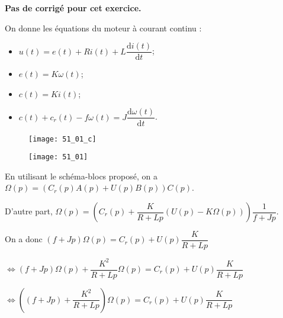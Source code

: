 \normaltrue \difficilefalse \tdifficilefalse
\correctiontrue


\setcounter{question}{0}
\ifcorrection
\else
\textbf{Pas de corrigé pour cet exercice.}
\fi


\ifprof 
\else
On donne les équations du moteur à courant continu :
\begin{itemize}
\item $u(t) = e(t)+ Ri(t) +L \dfrac{\text{d}i(t)}{\text{d} t}$;
\item $e(t)=K\omega(t)$;
\item $c(t)=Ki(t)$;
\item $c(t)+c_r(t)- f\omega(t)=J\dfrac{\text{d}\omega(t)}{\text{d} t}$.
\end{itemize}
\fi

\ifprof
\begin{figure}[H]
\centering
\texttt{[image: 51\_01\_c]}
\end{figure}
\else
\fi



\ifprof
\begin{figure}[H]
\centering
\texttt{[image: 51\_01]}
\end{figure}


En utilisant le schéma-blocs proposé, on a $\Omega(p) = \left(C_r(p)A(p)+U(p)B(p)\right)C(p)$.

D'autre part,  $\Omega(p)=\left( C_r(p) + \dfrac{K}{R+Lp}\left(U(p)-K\Omega(p) \right) \right) \dfrac{1}{f+Jp}$.

On a donc $\left(f+Jp \right)\Omega(p)= C_r(p) + U(p)\dfrac{K}{R+Lp}  $

$\Leftrightarrow \left(f+Jp \right)\Omega(p)+ \dfrac{K^2}{R+Lp}\Omega(p)  = C_r(p) + U(p)\dfrac{K}{R+Lp} $

$\Leftrightarrow \left(\left(f+Jp \right)+ \dfrac{K^2}{R+Lp}\right)\Omega(p)  = C_r(p) + U(p)\dfrac{K}{R+Lp} $

